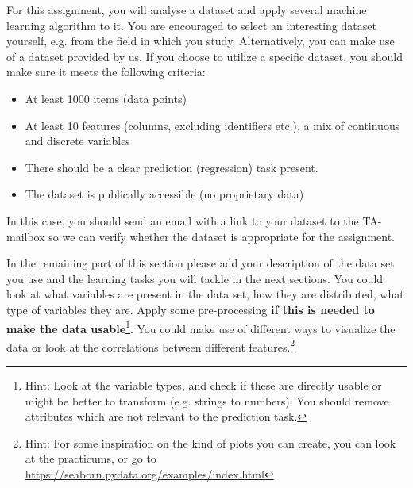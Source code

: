 \documentclass[runningheads]{llncs}
\begin{document}
For this assignment, you will analyse a dataset and apply several machine learning algorithm to it. You are encouraged to select an interesting dataset yourself, e.g. from the field in which you study. Alternatively, you can make use of a dataset provided by us. If you choose to utilize a specific dataset, you should make sure it meets the following criteria:
\begin{itemize}
    \item At least 1000 items (data points)
    \item At least 10 features (columns, excluding identifiers etc.), a mix of continuous and discrete variables
    \item There should be a clear prediction (regression) task present. 
    \item The dataset is publically accessible (no proprietary data)
\end{itemize}
In this case, you should send an email with a link to your dataset to the TA-mailbox so we can verify whether the dataset is appropriate for the assignment.

In the remaining part of this section please add your description of the data set you use and the learning tasks you will tackle in the next sections. You could look at what variables are present in the data set, how they are distributed, what type of variables they are. Apply some pre-processing \textbf{if this is needed to make the data usable}\footnote{Hint: Look at the variable types, and check if these are directly usable or might be better to transform (e.g. strings to numbers). You should remove attributes which are not relevant to the prediction task.}. You could make use of different ways to visualize the data or look at the correlations between different features.\footnote{Hint: For some inspiration on the kind of plots you can create, you can look at the practicums, or go to \url{https://seaborn.pydata.org/examples/index.html}}
\end{document}
